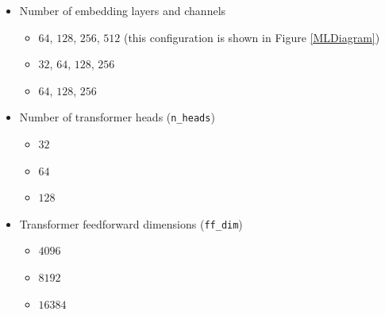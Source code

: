 \begin{itemize}

  \item Number of embedding layers and channels
    \begin{itemize}
      \item $64$, $128$, $256$, $512$ (this configuration is shown in Figure
        \ref{MLDiagram})
      \item $32$, $64$, $128$, $256$
      \item $64$, $128$, $256$
    \end{itemize}

  \item Number of transformer heads (\texttt{n\_heads})
    \begin{itemize}
      \item $32$
      \item $64$
      \item $128$
    \end{itemize}

  \item Transformer feedforward dimensions (\texttt{ff\_dim})
    \begin{itemize}
      \item $4096$
      \item $8192$
      \item $16384$
    \end{itemize}

\end{itemize}


